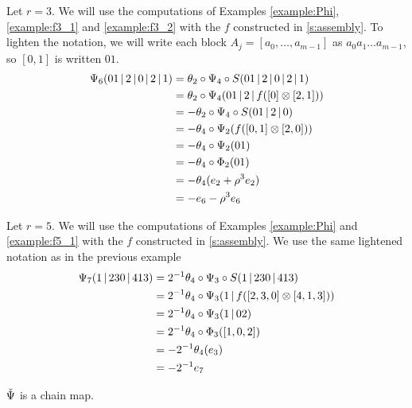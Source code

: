\begin{example}\label{example:psi3}
Let $r=3$. We will use the computations of Examples \ref{example:Phi}, \ref{example:f3_1} and \ref{example:f3_2} with the $f$ constructed in \cref{s:assembly}. To lighten the notation, we will write each block $A_j = [a_0,\dots,a_{m-1}]$ as $a_0a_1\dots a_{m-1}$, so $[0,1]$ is written $01$.
	\begin{align*}
		\Psi_6(01\operatorname{|} 2\operatorname{|} 0\operatorname{|} 2\operatorname{|} 1)
		&= \theta_2\circ \Psi_4\circ S(01\operatorname{|} 2\operatorname{|} 0\operatorname{|} 2\operatorname{|} 1)
		\\
		&= \theta_2\circ \Psi_4(01\operatorname{|} 2\operatorname{|} f([0] \otimes [2,1]))
		\\
		&= -\theta_2\circ \Psi_4\circ S(01\operatorname{|} 2\operatorname{|} 0)
		\\
		&= -\theta_4\circ \Psi_2(f([0,1] \otimes [2,0]))
		\\
		&= -\theta_4\circ \Psi_2(01)
		\\
		&= -\theta_4\circ \Phi_2(01)
		\\
		&= -\theta_4(e_2 + \rho^3e_2)
		\\
		&= -e_6 - \rho^3e_6
	\end{align*}
\end{example}

\begin{example}\label{example:psi5}
Let $r=5$. We will use the computations of Examples \ref{example:Phi} and \ref{example:f5_1} with the $f$ constructed in \cref{s:assembly}. We use the same lightened notation as in the previous example
	\begin{align*}
		\Psi_7(1\operatorname{|} 230\operatorname{|} 413)
		&= 2^{-1}\theta_4\circ \Psi_3\circ S(1\operatorname{|} 230\operatorname{|} 413)
		\\
		&= 2^{-1}\theta_4\circ \Psi_3(1\operatorname{|} f([2,3,0] \otimes [4,1,3]))
		\\
		&= 2^{-1}\theta_4\circ \Psi_3(1\operatorname{|} 02)
		\\
		&= 2^{-1}\theta_4\circ \Phi_3([1,0,2])
		\\
		&= -2^{-1}\theta_4(e_3)
		\\
		&= -2^{-1}e_7
	\end{align*}
\end{example}

\begin{proposition}\label{prop:chain}
	$\operatorname{\check{\Psi}}$ is a chain map. 
\end{proposition}

